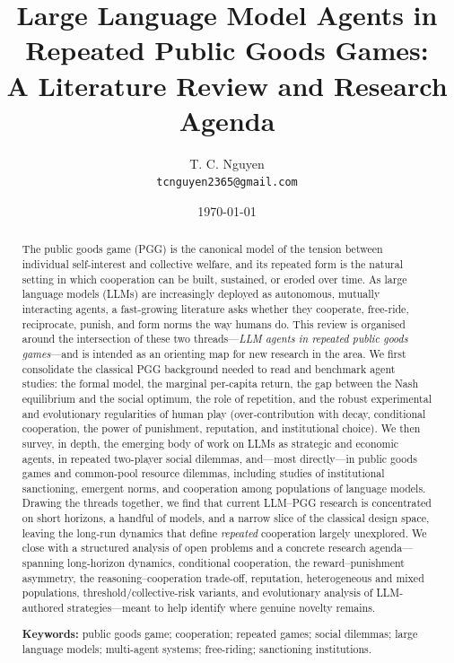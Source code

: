 \documentclass[11pt,a4paper]{article}
\title{\textbf{Large Language Model Agents in Repeated Public Goods Games:\\
A Literature Review and Research Agenda}}
\author{T. C. Nguyen\\[2pt]
\small \texttt{tcnguyen2365@gmail.com}}
\date{\today}
\newcommand{\pgg}{public goods game}
\begin{document}
\maketitle

\begin{abstract}
\noindent
The \pgg{} (PGG) is the canonical model of the tension between individual
self-interest and collective welfare, and its repeated form is the natural
setting in which cooperation can be built, sustained, or eroded over time. As
large language models (LLMs) are increasingly deployed as autonomous, mutually
interacting agents, a fast-growing literature asks whether they cooperate,
free-ride, reciprocate, punish, and form norms the way humans do. This review
is organised around the intersection of these two threads---\emph{LLM agents in
repeated public goods games}---and is intended as an orienting map for new
research in the area. We first consolidate the classical PGG background needed
to read and benchmark agent studies: the formal model, the marginal per-capita
return, the gap between the Nash equilibrium and the social optimum, the role of
repetition, and the robust experimental and evolutionary regularities of human
play (over-contribution with decay, conditional cooperation, the power of
punishment, reputation, and institutional choice). We then survey, in depth, the
emerging body of work on LLMs as strategic and economic agents, in repeated
two-player social dilemmas, and---most directly---in public goods games and
common-pool resource dilemmas, including studies of institutional sanctioning,
emergent norms, and cooperation among populations of language models. Drawing
the threads together, we find that current LLM--PGG research is concentrated on
short horizons, a handful of models, and a narrow slice of the classical design
space, leaving the long-run dynamics that define \emph{repeated} cooperation
largely unexplored. We close with a structured analysis of open problems and a
concrete research agenda---spanning long-horizon dynamics, conditional
cooperation, the reward--punishment asymmetry, the reasoning--cooperation
trade-off, reputation, heterogeneous and mixed populations, threshold/collective-risk
variants, and evolutionary analysis of LLM-authored strategies---meant to help
identify where genuine novelty remains.

\medskip
\noindent\textbf{Keywords:} public goods game; cooperation; repeated games;
social dilemmas; large language models; multi-agent systems; free-riding;
sanctioning institutions.
\end{abstract}
\end{document}
